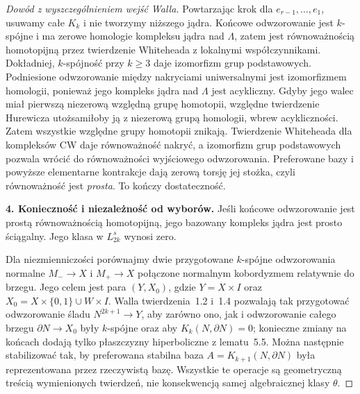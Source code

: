 \begin{proof}[Dowód z wyszczególnieniem wejść Walla]
Powtarzając krok dla $e_{r-1},\ldots,e_1$,
usuwamy całe $K_k$ i nie tworzymy niższego jądra.
Końcowe odwzorowanie jest $k$-spójne i ma zerowe homologie
kompleksu jądra nad $\Lambda$, zatem jest
równoważnością homotopijną przez twierdzenie
Whiteheada z lokalnymi współczynnikami. Dokładniej,
$k$-spójność przy $k\geq3$ daje izomorfizm grup
podstawowych. Podniesione odwzorowanie między nakryciami
uniwersalnymi jest izomorfizmem homologii, ponieważ
jego kompleks jądra nad $\Lambda$ jest acykliczny.
Gdyby jego walec miał pierwszą niezerową względną
grupę homotopii, względne twierdzenie Hurewicza
utożsamiłoby ją z niezerową grupą homologii, wbrew
acykliczności. Zatem wszystkie względne grupy homotopii
znikają. Twierdzenie Whiteheada dla kompleksów CW
daje równoważność nakryć, a izomorfizm grup podstawowych
pozwala wrócić do równoważności wyjściowego odwzorowania.
Preferowane bazy i powyższe elementarne kontrakcje
dają zerową torsję jej stożka, czyli równoważność
jest \emph{prosta}. To kończy dostateczność.

\textbf{4. Konieczność i niezależność od wyborów.}
Jeśli końcowe odwzorowanie jest prostą równoważnością
homotopijną, jego bazowany kompleks jądra jest
prosto ściągalny. Jego klasa w $L^s_{2k}$ wynosi zero.

Dla niezmienniczości porównajmy dwie przygotowane
$k$-spójne odwzorowania normalne $M_-\to X$ i $M_+\to X$
połączone normalnym kobordyzmem relatywnie do brzegu.
Jego celem jest para $(Y,X_0)$, gdzie
$Y=X\times I$ oraz
$X_0=X\times\{0,1\}\cup W\times I$.
Walla twierdzenia~1.2 i~1.4 pozwalają tak przygotować
odwzorowanie śladu $N^{2k+1}\to Y$, aby zarówno ono,
jak i odwzorowanie całego brzegu $\partial N\to X_0$
były $k$-spójne oraz aby $K_k(N,\partial N)=0$;
konieczne
zmiany na końcach dodają tylko płaszczyzny
hiperboliczne z lematu~5.5. Można następnie
stabilizować tak, by preferowana stabilna baza
$A=K_{k+1}(N,\partial N)$ była reprezentowana
przez rzeczywistą bazę. Wszystkie te operacje
są geometryczną treścią wymienionych twierdzeń,
nie konsekwencją samej algebraicznej klasy $\theta$.


\end{proof}
